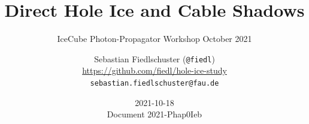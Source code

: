 \documentclass[green, 12pt]{beamer}
\title[Direct Hole Ice and Cable Shadows | IceCube Photon-Propagator Workshop October 2021]{Direct Hole Ice and Cable Shadows}
\subtitle{IceCube Photon-Propagator Workshop October 2021}
\date{2021-10-18 \\ \vspace*{2mm}\tiny{Document 2021-Phap0Ieb} \normalsize}
\author[Sebastian Fiedlschuster, ECAP Erlangen, 2021-10-18]{Sebastian Fiedlschuster (\texttt{@fiedl}) \\ \tiny{\url{https://github.com/fiedl/hole-ice-study}} \\ \tiny\texttt{sebastian.fiedlschuster@fau.de}}
\institute{Erlangen Centre for Astroparticle Physics}
\newif\ifplacelogo %
\begin{document}



\placelogofalse

  
%  
  
  
%  



%   
%   
%   
%   
%   





   
%
%   
%   
%
   
\end{document}
